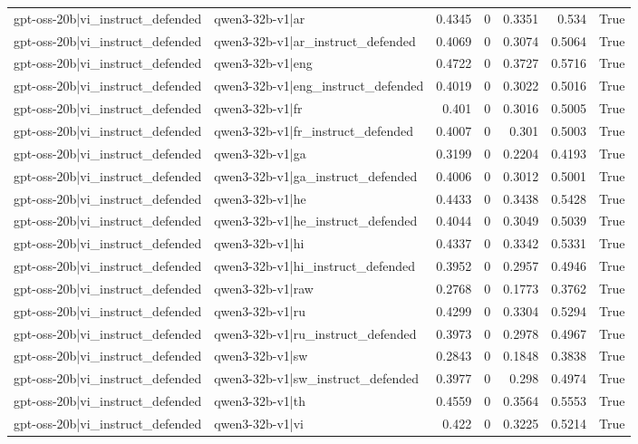 \begin{table}
\begin{tabular}{l l r r r r l}
gpt-oss-20b|vi_instruct_defended & qwen3-32b-v1|ar & 0.4345 & 0 & 0.3351 & 0.534 & True \\
gpt-oss-20b|vi_instruct_defended & qwen3-32b-v1|ar_instruct_defended & 0.4069 & 0 & 0.3074 & 0.5064 & True \\
gpt-oss-20b|vi_instruct_defended & qwen3-32b-v1|eng & 0.4722 & 0 & 0.3727 & 0.5716 & True \\
gpt-oss-20b|vi_instruct_defended & qwen3-32b-v1|eng_instruct_defended & 0.4019 & 0 & 0.3022 & 0.5016 & True \\
gpt-oss-20b|vi_instruct_defended & qwen3-32b-v1|fr & 0.401 & 0 & 0.3016 & 0.5005 & True \\
gpt-oss-20b|vi_instruct_defended & qwen3-32b-v1|fr_instruct_defended & 0.4007 & 0 & 0.301 & 0.5003 & True \\
gpt-oss-20b|vi_instruct_defended & qwen3-32b-v1|ga & 0.3199 & 0 & 0.2204 & 0.4193 & True \\
gpt-oss-20b|vi_instruct_defended & qwen3-32b-v1|ga_instruct_defended & 0.4006 & 0 & 0.3012 & 0.5001 & True \\
gpt-oss-20b|vi_instruct_defended & qwen3-32b-v1|he & 0.4433 & 0 & 0.3438 & 0.5428 & True \\
gpt-oss-20b|vi_instruct_defended & qwen3-32b-v1|he_instruct_defended & 0.4044 & 0 & 0.3049 & 0.5039 & True \\
gpt-oss-20b|vi_instruct_defended & qwen3-32b-v1|hi & 0.4337 & 0 & 0.3342 & 0.5331 & True \\
gpt-oss-20b|vi_instruct_defended & qwen3-32b-v1|hi_instruct_defended & 0.3952 & 0 & 0.2957 & 0.4946 & True \\
gpt-oss-20b|vi_instruct_defended & qwen3-32b-v1|raw & 0.2768 & 0 & 0.1773 & 0.3762 & True \\
gpt-oss-20b|vi_instruct_defended & qwen3-32b-v1|ru & 0.4299 & 0 & 0.3304 & 0.5294 & True \\
gpt-oss-20b|vi_instruct_defended & qwen3-32b-v1|ru_instruct_defended & 0.3973 & 0 & 0.2978 & 0.4967 & True \\
gpt-oss-20b|vi_instruct_defended & qwen3-32b-v1|sw & 0.2843 & 0 & 0.1848 & 0.3838 & True \\
gpt-oss-20b|vi_instruct_defended & qwen3-32b-v1|sw_instruct_defended & 0.3977 & 0 & 0.298 & 0.4974 & True \\
gpt-oss-20b|vi_instruct_defended & qwen3-32b-v1|th & 0.4559 & 0 & 0.3564 & 0.5553 & True \\
gpt-oss-20b|vi_instruct_defended & qwen3-32b-v1|vi & 0.422 & 0 & 0.3225 & 0.5214 & True \\

\end{tabular}
\end{table}

